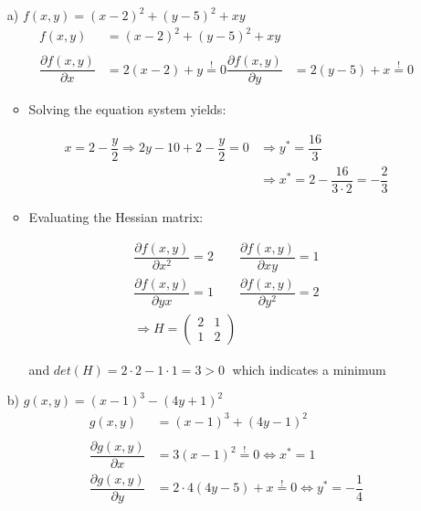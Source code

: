 \documentclass[12pt,a4paper]{article}
\begin{document}
\begin{itemize}
    \item[a)] $f(x,y) = (x -2)^2 + (y -5)^2 + xy$
    \begin{align*}
      f(x,y) & = (x -2)^2 + (y - 5)^2 + xy\\
      & \\
      \dfrac{\partial f(x,y)}{\partial x} & = 2(x -2) + y \overset{!}{=} 0
      \dfrac{\partial f(x,y)}{\partial y} & = 2(y -5) + x \overset{!}{=} 0 
    \end{align*}
    \begin{itemize}
      \item Solving the equation system yields:
    \end{itemize}
    \begin{align*}
      x = 2 -\dfrac{y}{2} \Rightarrow 2y - 10 + 2 - \dfrac{y}{2} = 0 &\Rightarrow y^{*} = \dfrac{16}{3} \\
      &\Rightarrow x^{*} = 2 -\dfrac{16}{3 \cdot 2} = - \dfrac{2}{3}
    \end{align*}
    \begin{itemize}
      \item Evaluating the Hessian matrix:
    \end{itemize}
    \begin{align*}
      \dfrac{\partial f(x,y)}{\partial x^2} = 2 \qquad  \dfrac{\partial f(x,y)}{\partial xy} = 1 \\
      \dfrac{\partial f(x,y)}{\partial yx} = 1  \qquad  \dfrac{\partial f(x,y)}{\partial y^2} = 2\\
      \Rightarrow H = 
      \begin{pmatrix}
        2 & 1 \\
        1 & 2
      \end{pmatrix}
    \end{align*}
    \begin{itemize}
      \item[] and $det(H) = 2 \cdot 2 - 1 \cdot 1 = 3 > 0 \;$ which indicates a minimum
    \end{itemize}
    \item[b)] $g(x,y) = (x -1)^3 - (4y + 1)^2$
    \begin{align*}
      g(x,y) & = (x -1)^3 + (4y - 1)^2\\
      & \\
      \dfrac{\partial g(x,y)}{\partial x} & = 3(x - 1)^2 \overset{!}{=} 0 \Leftrightarrow x^{*} = 1 \\
      \dfrac{\partial g(x,y)}{\partial y} & = 2 \cdot 4(4y -5) + x \overset{!}{=} 0 \Leftrightarrow y^{*} = - \dfrac{1}{4} 

\end{align*}
\end{itemize}
\end{document}
